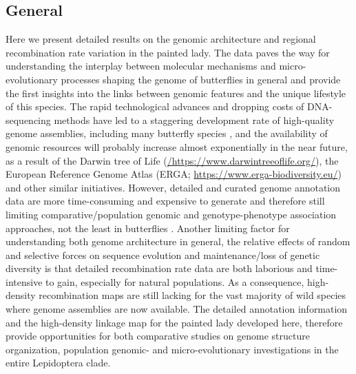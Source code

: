 \documentclass[twocolumn]{bmcart}%
\begin{document}
\subsection*{General}
Here we present detailed results on the genomic architecture and regional recombination rate variation in the painted lady. The data paves the way for understanding the interplay between molecular mechanisms and micro-evolutionary processes shaping the genome of butterflies in general and provide the first insights into the links between genomic features and the unique lifestyle of this species. The rapid technological advances and dropping costs of DNA-sequencing methods have led to a staggering development rate of high-quality genome assemblies, including many butterfly species \citep{celorio-manceraChromosomeLevelAssembly2021, guDichotomyDosageCompensation2019, liOutbredGenomeSequencing2015, smolanderImprovedChromosomelevelGenome2022, yangChromosomeLevelReference2020}, and the availability of genomic resources will probably increase almost exponentially in the near future, as a result of the Darwin tree of Life (\href{https://www.darwintreeoflife.org}{/https://www.darwintreeoflife.org/}), the European Reference Genome Atlas (ERGA; \href{https://www.erga-biodiversity.eu/}{https://www.erga-biodiversity.eu/}) and other similar initiatives. However, detailed and curated genome annotation data are more time-consuming and expensive to generate and therefore still limiting comparative/population genomic and genotype-phenotype association approaches, not the least in butterflies \citep{daveyNoEvidenceMaintenance2017, hillUnprecedentedReorganizationHolocentric2019, vanbelleghemComplexModularArchitecture2017}. Another limiting factor for understanding both genome architecture in general, the relative effects of random and selective forces on sequence evolution and maintenance/loss of genetic diversity is that detailed recombination rate data are both laborious and time-intensive to gain, especially for natural populations. As a consequence, high-density recombination maps are still lacking for the vast majority of wild species where genome assemblies are now available. The detailed annotation information and the high-density linkage map for the painted lady developed here, therefore provide opportunities for both comparative studies on genome structure organization, population genomic- and micro-evolutionary investigations in the entire Lepidoptera clade.
\end{document}
